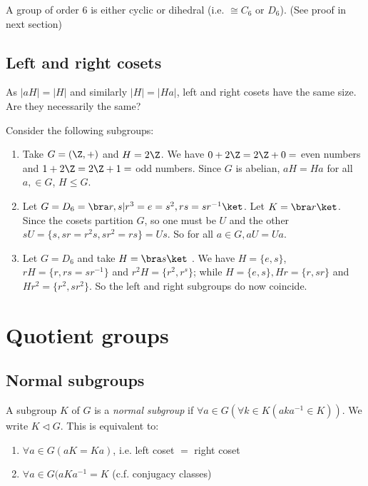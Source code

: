 \documentclass[a4paper]{article}
\begin{document}
  \begin{prop}
    A group of order $6$ is either cyclic or dihedral (i.e. $\cong C_6$ or $D_6$). (See proof in next section)
  \end{prop}

  \subsection{Left and right cosets}
  As $|aH| = |H|$  and similarly $|H| = |Ha|$, left and right cosets have the same size. Are they necessarily the same?
  \begin{eg}
    Consider the following subgroups:
    \begin{enumerate}
      \item Take $G = (\Z, +)$ and $H = 2\Z$. We have $0 + 2\Z = 2\Z + 0 = $ even numbers and $1 + 2\Z = 2\Z + 1 = $ odd numbers. Since $G$ is abelian, $aH = Ha$ for all $a, \in G$, $H\leq G$.
      \item Let $G = D_6 = \bra r, s | r^3 = e = s^2, rs = sr^{-1}\ket$. Let $K = \bra r\ket$. Since the cosets partition $G$, so one must be $U$ and the other $sU = \{s, sr = r^2s, sr^2 = rs\} = Us$. So for all $a\in G, aU = Ua$. 
      \item Let $G = D_6$ and take $H = \bra s\ket$ . We have $H = \{e, s\}$, $rH = \{r, rs = sr^{-1}\}$ and $r^2 H = \{r^2, r^s\}$; while $H = \{e, s\}, Hr = \{r, sr\}$ and $Hr^2=\{r^2, sr^2\}$. So the left and right subgroups do now coincide.
    \end{enumerate}
  \end{eg}

  \section{Quotient groups}
  \subsection{Normal subgroups}
  \begin{defi}
    A subgroup $K$ of $G$ is a \emph{normal subgroup} if $\forall a\in G(\forall k\in K(aka^{-1}\in K))$. We write $K\lhd G$. This is equivalent to:
    \begin{enumerate}
      \item $\forall a\in G(aK = Ka)$, i.e. left coset $=$ right coset
      \item $\forall a\in G(aKa^{-1} = K$ (c.f. conjugacy classes)
    \end{enumerate}
  \end{defi}
\end{document}
